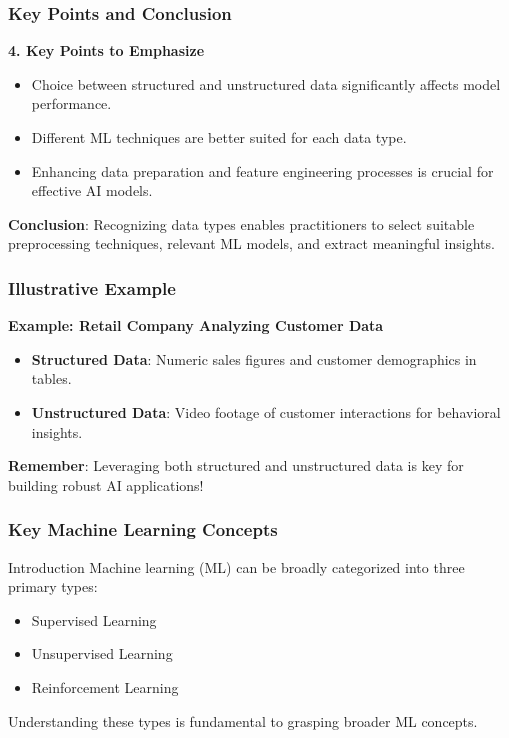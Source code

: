 \documentclass[aspectratio=169]{beamer}
\begin{document}
\begin{frame}[fragile]
    \frametitle{Key Points and Conclusion}
    \textbf{4. Key Points to Emphasize}
    \begin{itemize}
        \item Choice between structured and unstructured data significantly affects model performance.
        \item Different ML techniques are better suited for each data type.
        \item Enhancing data preparation and feature engineering processes is crucial for effective AI models.
    \end{itemize}

    \textbf{Conclusion}: Recognizing data types enables practitioners to select suitable preprocessing techniques, relevant ML models, and extract meaningful insights.
\end{frame}

\begin{frame}[fragile]
    \frametitle{Illustrative Example}
    \textbf{Example: Retail Company Analyzing Customer Data}
    \begin{itemize}
        \item \textbf{Structured Data}: Numeric sales figures and customer demographics in tables.
        \item \textbf{Unstructured Data}: Video footage of customer interactions for behavioral insights.
    \end{itemize}

    \textbf{Remember}: Leveraging both structured and unstructured data is key for building robust AI applications!
\end{frame}

\begin{frame}[fragile]
    \frametitle{Key Machine Learning Concepts}
    \begin{block}{Introduction}
        Machine learning (ML) can be broadly categorized into three primary types:
        \begin{itemize}
            \item Supervised Learning
            \item Unsupervised Learning
            \item Reinforcement Learning
        \end{itemize}
        Understanding these types is fundamental to grasping broader ML concepts.
    \end{block}
\end{frame}
\end{document}
